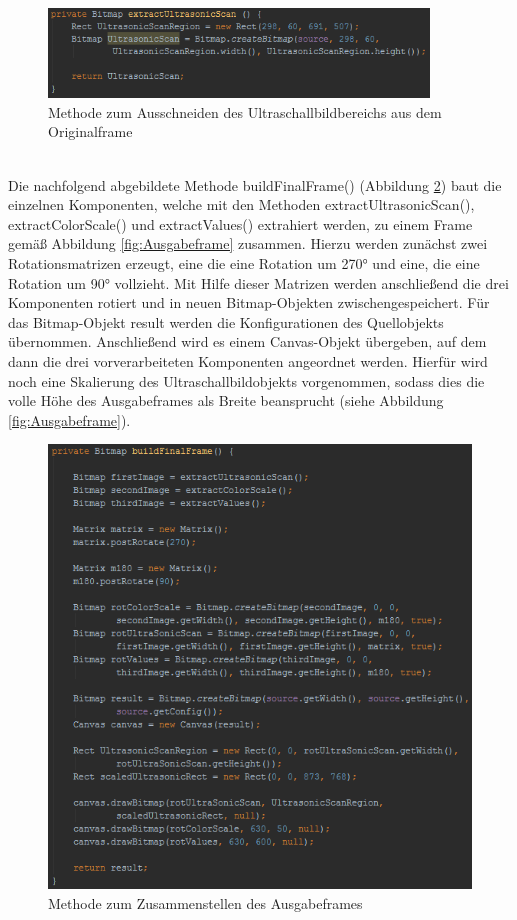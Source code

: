 \begin{figure}[h]
	\centering
	\includegraphics[width=0.9\textwidth]{Bilder/Bildverarbeitung/extractUltrasonicScan.PNG}
	\caption{Methode zum Ausschneiden des Ultraschallbildbereichs aus dem Originalframe}
	\label{fig:extractUltrasonicScan}
\end{figure}

~\\
Die nachfolgend abgebildete Methode buildFinalFrame() (Abbildung \ref{fig:buildFinalFrame}) baut die einzelnen Komponenten, welche mit den Methoden extractUltrasonicScan(), extractColorScale() und extractValues() extrahiert werden, zu einem Frame gemäß Abbildung \ref{fig:Ausgabeframe} zusammen. Hierzu werden zunächst zwei Rotationsmatrizen erzeugt, eine die eine Rotation um 270° und eine, die eine Rotation um 90° vollzieht. Mit Hilfe dieser Matrizen werden anschließend die drei Komponenten rotiert und in neuen Bitmap-Objekten zwischengespeichert. Für das Bitmap-Objekt result werden die Konfigurationen des Quellobjekts übernommen. Anschließend wird es einem Canvas-Objekt übergeben, auf dem dann die drei vorverarbeiteten Komponenten angeordnet werden. Hierfür wird noch eine Skalierung des Ultraschallbildobjekts vorgenommen, sodass dies die volle Höhe des Ausgabeframes als Breite beansprucht (siehe Abbildung \ref{fig:Ausgabeframe}).
\clearpage
\begin{figure}[h]
	\centering
	\includegraphics[width=1\textwidth]{Bilder/Bildverarbeitung/buildFinalFrame.PNG}
	\caption{Methode zum Zusammenstellen des Ausgabeframes}
	\label{fig:buildFinalFrame}
\end{figure}
